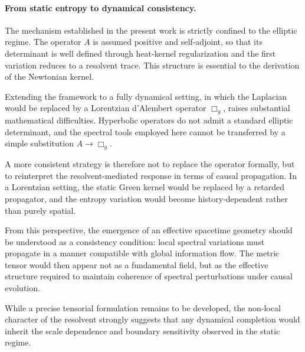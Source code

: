   \paragraph{From static entropy to dynamical consistency.}

    The mechanism established in the present work is strictly confined
    to the elliptic regime.
    The operator $A$ is assumed positive and self-adjoint,
    so that its determinant is well defined through heat-kernel
    regularization and the first variation reduces to a resolvent trace.
    This structure is essential to the derivation of the Newtonian
    kernel.

    Extending the framework to a fully dynamical setting,
    in which the Laplacian would be replaced by a Lorentzian
    d'Alembert operator $\Box_g$, raises substantial mathematical
    difficulties.
    Hyperbolic operators do not admit a standard elliptic determinant,
    and the spectral tools employed here cannot be transferred
    by a simple substitution $A \to \Box_g$.

    A more consistent strategy is therefore not to replace
    the operator formally, but to reinterpret the resolvent-mediated
    response in terms of causal propagation.
    In a Lorentzian setting, the static Green kernel would be replaced
    by a retarded propagator, and the entropy variation would become
    history-dependent rather than purely spatial.

    From this perspective, the emergence of an effective spacetime
    geometry should be understood as a consistency condition:
    local spectral variations must propagate in a manner compatible
    with global information flow.
    The metric tensor would then appear not as a fundamental field,
    but as the effective structure required to maintain coherence
    of spectral perturbations under causal evolution.

    While a precise tensorial formulation remains to be developed,
    the non-local character of the resolvent strongly suggests that
    any dynamical completion would inherit the scale dependence
    and boundary sensitivity observed in the static regime.

